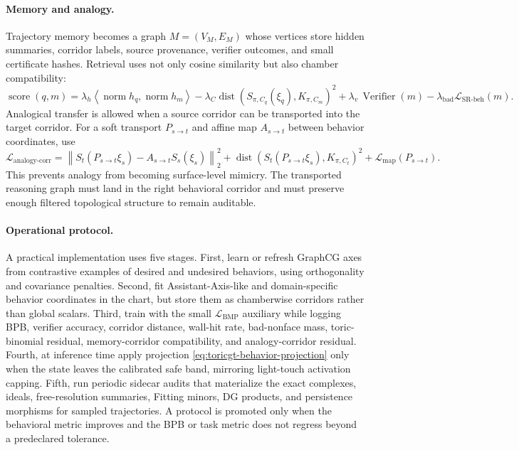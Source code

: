 \documentclass[11pt]{article}
\theoremstyle{definition}
\theoremstyle{plain}
\theoremstyle{remark}
\numberwithin{equation}{section}
\newcommand{\norm}[1]{\left\lVert #1\right\rVert}
\newcommand{\ip}[2]{\left\langle #1,#2\right\rangle}
\begin{document}
\paragraph{Memory and analogy.}
Trajectory memory becomes a graph $M=(V_M,E_M)$ whose vertices store hidden summaries, corridor labels, source provenance, verifier outcomes, and small certificate hashes.  Retrieval uses not only cosine similarity but also chamber compatibility:
\begin{equation}
  \operatorname{score}(q,m)
  =
  \lambda_h\ip{\operatorname{norm} h_q}{\operatorname{norm} h_m}
  -\lambda_C\operatorname{dist}(S_{\pi,C_q}(\xi_q),K_{\pi,C_m})^2
  +\lambda_v\,\operatorname{Verifier}(m)
  -\lambda_{\mathrm{bad}}\mathcal L_{\mathrm{SR\text{-}beh}}(m).
\end{equation}
Analogical transfer is allowed when a source corridor can be transported into the target corridor.  For a soft transport $P_{s\to t}$ and affine map $A_{s\to t}$ between behavior coordinates, use
\begin{equation}
  \mathcal L_{\mathrm{analogy\text{-}corr}}
  =
  \norm{S_t(P_{s\to t}\xi_s)-A_{s\to t}S_s(\xi_s)}_2^2
  +\operatorname{dist}(S_t(P_{s\to t}\xi_s),K_{\pi,C_t})^2
  +\mathcal L_{\mathrm{map}}(P_{s\to t}).
\end{equation}
This prevents analogy from becoming surface-level mimicry.  The transported reasoning graph must land in the right behavioral corridor and must preserve enough filtered topological structure to remain auditable.

\paragraph{Operational protocol.}
A practical implementation uses five stages.  First, learn or refresh GraphCG axes from contrastive examples of desired and undesired behaviors, using orthogonality and covariance penalties.  Second, fit Assistant-Axis-like and domain-specific behavior coordinates in the chart, but store them as chamberwise corridors rather than global scalars.  Third, train with the small $\mathcal L_{\mathrm{BMP}}$ auxiliary while logging BPB, verifier accuracy, corridor distance, wall-hit rate, bad-nonface mass, toric-binomial residual, memory-corridor compatibility, and analogy-corridor residual.  Fourth, at inference time apply projection \eqref{eq:toricgt-behavior-projection} only when the state leaves the calibrated safe band, mirroring light-touch activation capping.  Fifth, run periodic sidecar audits that materialize the exact complexes, ideals, free-resolution summaries, Fitting minors, DG products, and persistence morphisms for sampled trajectories.  A protocol is promoted only when the behavioral metric improves and the BPB or task metric does not regress beyond a predeclared tolerance.
\end{document}
